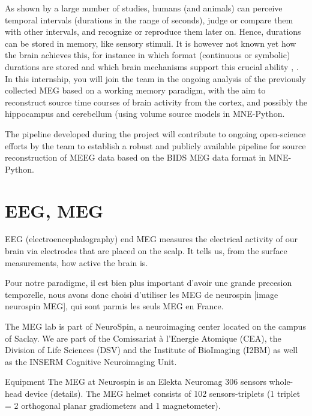 As shown by a large number of studies, humans (and animals) can perceive
temporal intervals (durations in the range of seconds), judge or compare them with other
intervals, and recognize or reproduce them later on. Hence, durations can be stored in
memory, like sensory stimuli. It is however not known yet how the brain achieves this, for
instance in which format (continuous or symbolic) durations are stored and which brain
mechanisms support this crucial ability \cite{polti2018effect}, \cite{teki2014working}. In this internship, you will join the team in the
ongoing analysis of the previously collected MEG based on a working memory paradigm,
with the aim to reconstruct source time courses of brain activity from the cortex, and
possibly the hippocampus and cerebellum \cite{gauthier2020hippocampal}(using volume source models in MNE-Python.

The pipeline developed during the project will contribute to ongoing open-science
efforts by the team to establish a robust and publicly available pipeline for source
reconstruction of MEEG data based on the BIDS MEG data format in MNE-Python.




\section{EEG, MEG}

EEG (electroencephalography) end MEG measures the electrical activity of our brain via electrodes that are placed on the scalp. It tells us, from the surface measurements, how active the brain is.

Pour notre paradigme, il est bien plus important d'avoir une grande precesion temporelle, nous avons donc choisi d'utiliser les MEG de neurospin [image neurospin MEG], qui sont parmis les seuls MEG en France.


The MEG lab is part of NeuroSpin, a neuroimaging center located on the campus of Saclay. We are part of the Comissariat à l'Energie Atomique (CEA), the Division of Life Sciences (DSV) and the Institute of BioImaging (I2BM) as well as the INSERM Cognitive Neuroimaging Unit.

Equipment
The MEG at Neurospin is an Elekta Neuromag 306 sensors whole-head device (details). The MEG helmet consists of 102 sensors-triplets (1 triplet = 2 orthogonal planar gradiometers and 1 magnetometer).



